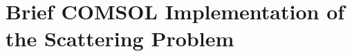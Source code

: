\documentclass[11pt]{Latex/Classes/PhDthesisPSnPDF}
\begin{document}
\chapter{Brief COMSOL Implementation of the Scattering Problem}
    \label{app:COMSOL}
    


%
%

\setlength{}
\printbibliography

\newpage
\printindex
\end{document}
